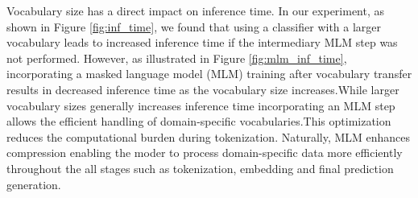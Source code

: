 \documentclass[11pt]{article}
\begin{document}
Vocabulary size has a direct impact on inference time. In our experiment, as shown in Figure \ref{fig:inf_time}, we found that using a classifier with a larger vocabulary leads to increased inference time if the intermediary MLM step was not performed. However, as illustrated in Figure \ref{fig:mlm_inf_time}, incorporating a masked language model (MLM) training after vocabulary transfer results in decreased inference time as the vocabulary size increases.While larger vocabulary sizes generally increases inference time incorporating an MLM step allows the efficient handling of domain-specific vocabularies.This optimization reduces the computational burden during tokenization. Naturally, MLM enhances compression enabling the moder to process domain-specific data more efficiently throughout the all stages such as tokenization, embedding and final prediction generation.



\end{document}
